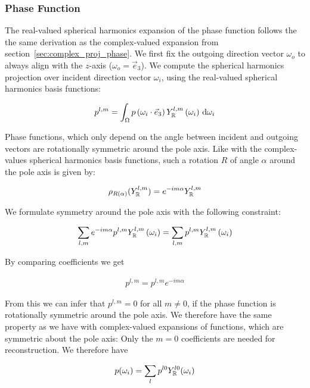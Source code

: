 \documentclass[10pt]{scrartcl}
\begin{document}
\subsubsection{Phase Function}

The real-valued spherical harmonics expansion of the phase function follows the the same derivation as the complex-valued expansion from section~\ref{sec:complex_proj_phase}. We first fix the outgoing direction vector $\omega_o$ to always align with the $z$-axis ($\omega_o=\vec{e}_3$). We compute the spherical harmonics projection over incident direction vector $\omega_i$, using the real-valued spherical harmonics basis functions:

\begin{align*}
p^{l,m}
=
\int_\Omega
{
p\left(\omega_i\cdot\vec{e}_3\right)
Y_{\mathbb{R}}^{l,m}\left(\omega_i\right)
\,\mathrm{d}\omega_i
}
\nonumber
\end{align*}

Phase functions, which only depend on the angle between incident and outgoing vectors are rotationally symmetric around the pole axis. Like with the complex-values spherical harmonics basis functions, such a rotation $R$ of angle $\alpha$ around the pole axis is given by:

\begin{align*}
\rho_{R(\alpha)}(Y_{\mathbb{R}}^{l,m}) = e^{-i m\alpha}Y_{\mathbb{R}}^{l,m}
\end{align*}

We formulate symmetry around the pole axis with the following constraint:

\begin{align*}
\sum_{l,m}
{
e^{-i m\alpha}
p^{l,m}
Y_{\mathbb{R}}^{l,m} }\left(\omega_i\right)
=
\sum_{l,m}
{
p^{l,m}
Y_{\mathbb{R}}^{l,m}\left(\omega_i\right)
}
\end{align*}

By comparing coefficients we get

\begin{align*}
p^{l,m} = p^{l,m}e^{-i m\alpha}
\end{align*}

From this we can infer that $p^{l,m} = 0$ for all $m\ne0$, if the phase function is rotationally symmetric around the pole axis. We therefore have the same property as we have with complex-valued expansions of functions, which are symmetric about the pole axis: Only the $m=0$ coefficients are needed for reconstruction. We therefore have

\begin{align}
\label{eq:sh_exp_phase}
p(\omega_i) =
\sum_l
{
p^{l0}
Y_{\mathbb{R}}^{l0}(\omega_i)
}
\end{align}
\end{document}
